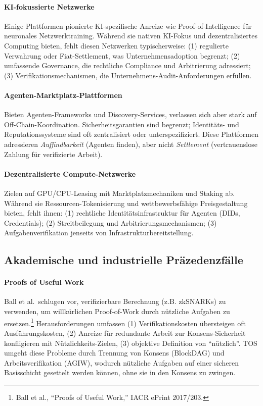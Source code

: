 \documentclass[11pt]{article}
\begin{document}
\paragraph{KI-fokussierte Netzwerke} Einige Plattformen pionierte KI-spezifische Anreize wie Proof-of-Intelligence für neuronales Netzwerktraining. Während sie nativen KI-Fokus und dezentralisiertes Computing bieten, fehlt diesen Netzwerken typischerweise: (1) regulierte Verwahrung oder Fiat-Settlement, was Unternehmensadoption begrenzt; (2) umfassende Governance, die rechtliche Compliance und Arbitrierung adressiert; (3) Verifikationsmechanismen, die Unternehmens-Audit-Anforderungen erfüllen.

\paragraph{Agenten-Marktplatz-Plattformen} Bieten Agenten-Frameworks und Discovery-Services, verlassen sich aber stark auf Off-Chain-Koordination. Sicherheitsgarantien sind begrenzt; Identitäts- und Reputationssysteme sind oft zentralisiert oder unterspezifiziert. Diese Plattformen adressieren \emph{Auffindbarkeit} (Agenten finden), aber nicht \emph{Settlement} (vertrauenslose Zahlung für verifizierte Arbeit).

\paragraph{Dezentralisierte Compute-Netzwerke} Zielen auf GPU/CPU-Leasing mit Marktplatzmechaniken und Staking ab. Während sie Ressourcen-Tokenisierung und wettbewerbsfähige Preisgestaltung bieten, fehlt ihnen: (1) rechtliche Identitätsinfrastruktur für Agenten (DIDs, Credentials); (2) Streitbeilegung und Arbitrierungsmechanismen; (3) Aufgabenverifikation jenseits von Infrastrukturbereitstellung.

\subsection{Akademische und industrielle Präzedenzfälle}
\paragraph{Proofs of Useful Work} Ball et al.\ schlugen vor, verifizierbare Berechnung (z.B. zkSNARKs) zu verwenden, um willkürlichen Proof-of-Work durch nützliche Aufgaben zu ersetzen.\footnote{Ball et al., ``Proofs of Useful Work,'' IACR ePrint 2017/203.} Herausforderungen umfassen (1) Verifikationskosten übersteigen oft Ausführungskosten, (2) Anreize für redundante Arbeit zur Konsens-Sicherheit konfligieren mit Nützlichkeits-Zielen, (3) objektive Definition von ``nützlich''. TOS umgeht diese Probleme durch Trennung von Konsens (BlockDAG) und Arbeitsverifikation (AGIW), wodurch nützliche Aufgaben auf einer sicheren Basisschicht gesettelt werden können, ohne sie in den Konsens zu zwingen.
\end{document}
